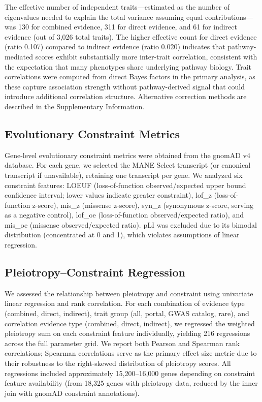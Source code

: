 The effective number of independent traits---estimated as the number of eigenvalues needed to explain the total variance assuming equal contributions---was 130 for combined evidence, 311 for direct evidence, and 61 for indirect evidence (out of 3,026 total traits). The higher effective count for direct evidence (ratio 0.107) compared to indirect evidence (ratio 0.020) indicates that pathway-mediated scores exhibit substantially more inter-trait correlation, consistent with the expectation that many phenotypes share underlying pathway biology. Trait correlations were computed from direct Bayes factors in the primary analysis, as these capture association strength without pathway-derived signal that could introduce additional correlation structure. Alternative correction methods are described in the Supplementary Information.

\subsection{Evolutionary Constraint Metrics}

Gene-level evolutionary constraint metrics were obtained from the gnomAD v4 database. For each gene, we selected the MANE Select transcript (or canonical transcript if unavailable), retaining one transcript per gene. We analyzed six constraint features: LOEUF (loss-of-function observed/expected upper bound confidence interval; lower values indicate greater constraint), lof\_z (loss-of-function z-score), mis\_z (missense z-score), syn\_z (synonymous z-score, serving as a negative control), lof\_oe (loss-of-function observed/expected ratio), and mis\_oe (missense observed/expected ratio). pLI was excluded due to its bimodal distribution (concentrated at 0 and 1), which violates assumptions of linear regression.

\subsection{Pleiotropy--Constraint Regression}

We assessed the relationship between pleiotropy and constraint using univariate linear regression and rank correlation. For each combination of evidence type (combined, direct, indirect), trait group (all, portal, GWAS catalog, rare), and correlation evidence type (combined, direct, indirect), we regressed the weighted pleiotropy sum on each constraint feature individually, yielding 216 regressions across the full parameter grid. We report both Pearson and Spearman rank correlations; Spearman correlations serve as the primary effect size metric due to their robustness to the right-skewed distribution of pleiotropy scores. All regressions included approximately 15,200--16,000 genes depending on constraint feature availability (from 18,325 genes with pleiotropy data, reduced by the inner join with gnomAD constraint annotations).
